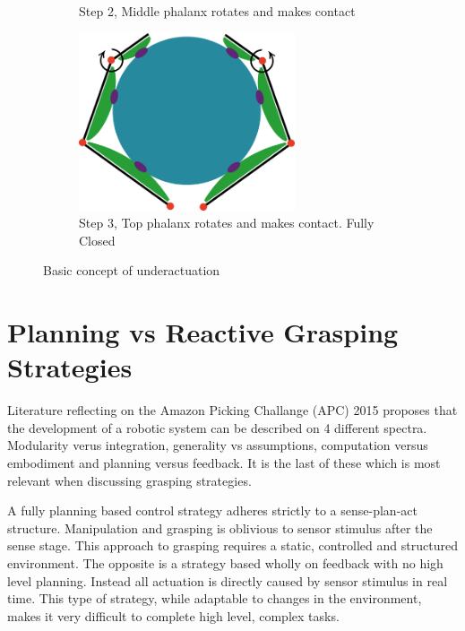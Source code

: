 \begin{figure}
\begin{subfigure}{.3\linewidth}
        \caption{Step 2, Middle phalanx rotates and makes contact}
        \label{fig:UAStep2}
    \end{subfigure}
    \begin{subfigure}{.3\linewidth}
        \centering
        \includegraphics[width=0.7\textwidth]{Images/Underactuaction/FullyClosed.png}         
        \caption{Step 3, Top phalanx rotates and makes contact. Fully Closed}
        \label{fig:UAStep3}
    \end{subfigure}
    \caption{Basic concept of underactuation}
    \label{fig:UnderActucation}
\end{figure}

\section{Planning vs Reactive Grasping Strategies}

Literature reflecting on the Amazon Picking Challange (APC) 2015 \cite{Eppner2018} proposes that the development of a robotic system can be described on 4 different spectra. Modularity verus integration, generality vs assumptions, computation versus embodiment and planning versus feedback. It is the last of these which is most relevant when discussing grasping strategies.

A fully planning based control strategy adheres strictly to a sense-plan-act structure. Manipulation and grasping is oblivious to sensor stimulus after the sense stage. This approach to grasping requires a static, controlled and structured environment. The opposite is a strategy based wholly on feedback with no high level planning. Instead all actuation is directly caused by sensor stimulus in real time. This type of strategy, while adaptable to changes in the environment, makes it very difficult to complete high level, complex tasks.

